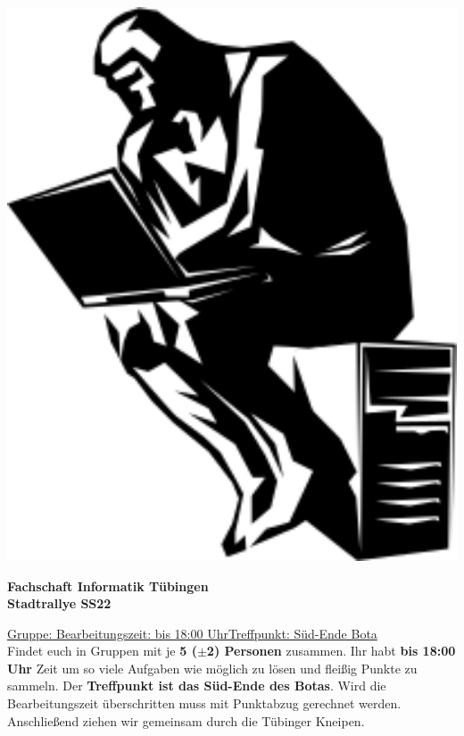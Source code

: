 \documentclass[11pt,paper=a4,answers]{exam}
\newcommand{\semester}{SS22}
\newcommand{\bearbeitungszeit}{bis 18:00 Uhr}
\newcommand{\treffpunkt}{Süd-Ende Bota}
\newcommand{\treffpunktinline}{das Süd-Ende des Botas}
\begin{document}
	
\noindent
\begin{minipage}[l]{.1\textwidth}
\noindent
\includegraphics[width=1.5\textwidth]{graphics/denker}
\end{minipage}
\begin{minipage}[r]{.8\textwidth}
\begin{center}
{\large \bfseries Fachschaft Informatik Tübingen \\
\Large Stadtrallye \semester \par}
\end{center}
\end{minipage}
\par
\vspace{0.5cm}
\noindent
\uline{Gruppe:\hspace{2cm} \hfill Bearbeitungszeit: \bearbeitungszeit   \hfill     Treffpunkt: \treffpunkt}
\vspace{0.5cm}\\
Findet euch in Gruppen mit je \textbf{5 ($\pm$2) Personen} zusammen. Ihr habt \textbf{\bearbeitungszeit} Zeit um so viele Aufgaben wie möglich zu lösen und fleißig Punkte zu sammeln. Der \textbf{Treffpunkt ist \treffpunktinline}. Wird die Bearbeitungszeit überschritten muss mit Punktabzug gerechnet werden. Anschließend ziehen wir gemeinsam durch die Tübinger Kneipen. 
\end{document}

